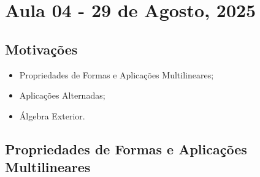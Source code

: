 \documentclass[../differential_forms.tex]{subfiles}
\begin{document}
\section{Aula 04 - 29 de Agosto, 2025}
\subsection{Motivações}
\begin{itemize}
	\item Propriedades de Formas e Aplicações Multilineares;
	\item Aplicações Alternadas;
	\item Álgebra Exterior.
\end{itemize}
\subsection{Propriedades de Formas e Aplicações Multilineares}
\end{document}
